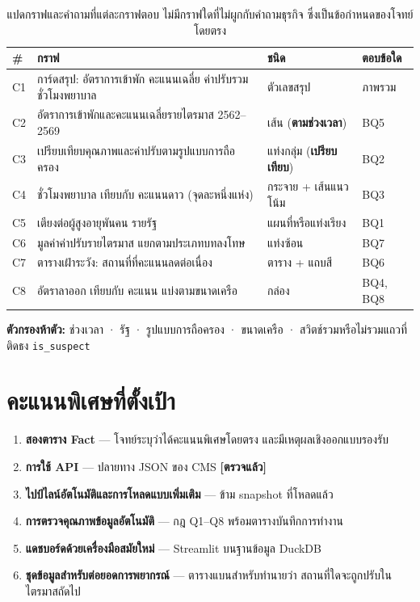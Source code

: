 \documentclass[11pt,a4paper]{article}
\newcommand{\sansall}{\sffamily}
\newcommand{\code}[1]{\texttt{#1}}
\newcommand{\ok}{\textcolor{dw}{\textbf{[ตรวจแล้ว]}}}
\begin{document}
\begin{table}[H]\centering\small
\begin{tabular}{L{0.9cm} L{6.2cm} L{3.6cm} L{4.4cm}}
\toprule
\sansall\bfseries \# & \sansall\bfseries กราฟ & \sansall\bfseries ชนิด &
\sansall\bfseries ตอบข้อใด \\
\midrule
C1 & การ์ดสรุป: อัตราการเข้าพัก คะแนนเฉลี่ย ค่าปรับรวม ชั่วโมงพยาบาล & ตัวเลขสรุป &
  ภาพรวม \\
C2 & อัตราการเข้าพักและคะแนนเฉลี่ยรายไตรมาส 2562--2569 &
  เส้น (\textbf{ตามช่วงเวลา}) & BQ5 \\
C3 & เปรียบเทียบคุณภาพและค่าปรับตามรูปแบบการถือครอง &
  แท่งกลุ่ม (\textbf{เปรียบเทียบ}) & BQ2 \\
C4 & ชั่วโมงพยาบาล เทียบกับ คะแนนดาว (จุดละหนึ่งแห่ง) & กระจาย + เส้นแนวโน้ม & BQ3 \\
C5 & เตียงต่อผู้สูงอายุพันคน รายรัฐ & แผนที่หรือแท่งเรียง & BQ1 \\
C6 & มูลค่าค่าปรับรายไตรมาส แยกตามประเภทบทลงโทษ & แท่งซ้อน & BQ7 \\
C7 & ตารางเฝ้าระวัง: สถานที่ที่คะแนนลดต่อเนื่อง & ตาราง + แถบสี & BQ6 \\
C8 & อัตราลาออก เทียบกับ คะแนน แบ่งตามขนาดเครือ & กล่อง & BQ4, BQ8 \\
\bottomrule
\end{tabular}
\caption{แปดกราฟและคำถามที่แต่ละกราฟตอบ ไม่มีกราฟใดที่ไม่ผูกกับคำถามธุรกิจ ซึ่งเป็นข้อกำหนดของโจทย์โดยตรง}
\end{table}

\textbf{ตัวกรองห้าตัว:} ช่วงเวลา · รัฐ · รูปแบบการถือครอง · ขนาดเครือ ·
สวิตช์รวมหรือไม่รวมแถวที่ติดธง \code{is_suspect}

\section{คะแนนพิเศษที่ตั้งเป้า}
\begin{enumerate}
\item \textbf{สองตาราง Fact} --- โจทย์ระบุว่าได้คะแนนพิเศษโดยตรง และมีเหตุผลเชิงออกแบบรองรับ
\item \textbf{การใช้ API} --- ปลายทาง JSON ของ CMS \ok{}
\item \textbf{ไปป์ไลน์อัตโนมัติและการโหลดแบบเพิ่มเติม} --- ข้าม snapshot ที่โหลดแล้ว
\item \textbf{การตรวจคุณภาพข้อมูลอัตโนมัติ} --- กฎ Q1--Q8 พร้อมตารางบันทึกการทำงาน
\item \textbf{แดชบอร์ดด้วยเครื่องมือสมัยใหม่} --- Streamlit บนฐานข้อมูล DuckDB
\item \textbf{ชุดข้อมูลสำหรับต่อยอดการพยากรณ์} --- ตารางแบนสำหรับทำนายว่า
      สถานที่ใดจะถูกปรับในไตรมาสถัดไป
\end{enumerate}
\end{document}
